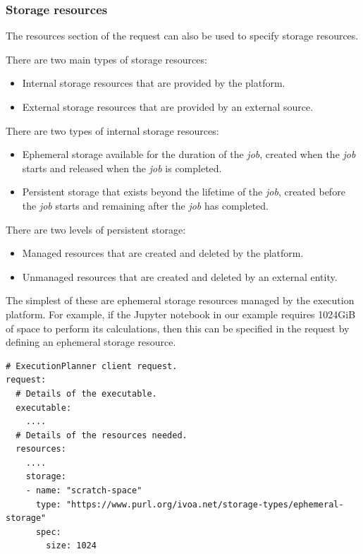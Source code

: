 \documentclass[11pt,a4paper]{ivoa}
\newcommand{\jupyternotebook} {Jupyter notebook}
\newcommand{\job} {\textit{job}}
\begin{document}
\subsubsection{Storage resources}
\label{storage-resources}

The resources section of the request can also be used to specify storage resources.

There are two main types of storage resources:
\begin{itemize}
    \item Internal storage resources that are provided by the platform.
    \item External storage resources that are provided by an external source.
\end{itemize}

There are two types of internal storage resources:
\begin{itemize}
    \item Ephemeral storage available for the duration of the \job{}, created when the \job{} starts and released when the \job{} is completed.
    \item Persistent storage that exists beyond the lifetime of the \job{}, created before the \job{} starts and remaining after the \job{} has completed.
\end{itemize}

There are two levels of persistent storage:
\begin{itemize}
    \item Managed resources that are created and deleted by the platform.
    \item Unmanaged resources that are created and deleted by an external entity.
\end{itemize}

The simplest of these are ephemeral storage resources managed by the execution platform.
For example, if the \jupyternotebook{} in our example requires 1024GiB of space to perform its calculations,
then this can be specified in the request by defining an ephemeral storage resource.

\begin{lstlisting}[]
# ExecutionPlanner client request.
request:
  # Details of the executable.
  executable:
    ....
  # Details of the resources needed.
  resources:
    ....
    storage:
    - name: "scratch-space"
      type: "https://www.purl.org/ivoa.net/storage-types/ephemeral-storage"
      spec:
        size: 1024
\end{lstlisting}
\end{document}
